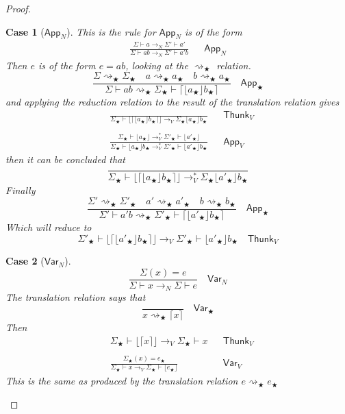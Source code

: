 \documentclass[float=false, crop=false]{standalone}
\newtheorem{case}{Case}
\numberwithin{subcase}{case}
\newcommand{\tlang}{\bigstar}
\newcommand{\thunk}[1]{\lceil #1 \rceil}
\newcommand{\unwrap}[1]{\lfloor #1 \rfloor}
\newcommand{\tcbn}{\rightarrow_N}
\newcommand{\tcbv}{\rightarrow_V}
\newcommand{\tccbv}{\rightarrow_V^*}
\newcommand{\tlthunk}{\rightsquigarrow_\tlang}
\begin{document}
\begin{proof}
  \begin{case}[$\mathsf{App}_N$]
    This is the rule for $\textsf{App}_N$ is of the form
    \begin{align*}
      \frac{\Sigma \vdash a \tcbn \Sigma' \vdash a'}
      {\Sigma \vdash ab \tcbn \Sigma' \vdash a' b} && \mathsf{App}_N
    \end{align*}
    Then $e$ is of the form $e = a b$, looking at the $\tlthunk$ relation.
    \[\frac{\Sigma \tlthunk \Sigma_\tlang \quad a 
        \tlthunk a_\tlang \quad b \tlthunk a_\tlang}
      { \Sigma \vdash a b\tlthunk \Sigma_\tlang \vdash 
        \thunk{\unwrap{a_\tlang }b_\tlang}} \quad \mathsf{App}_\tlang\]
    and applying the reduction relation to the result of the translation 
    relation gives
    \begin{align*}
      &\frac{}{\Sigma_\tlang \vdash \unwrap{\thunk{\unwrap{a_\tlang} b_\tlang} }  
        \tcbv \Sigma_\tlang  \unwrap{a_\tlang} b_\tlang} && \mathsf{Thunk}_V\\ \\
      &\frac{\Sigma_\tlang \vdash \unwrap{a_\tlang} \tccbv \Sigma'_\tlang \vdash \unwrap{a'_\tlang}}{
      \Sigma_\tlang \vdash \unwrap{a_\tlang} b_\tlang \tccbv \Sigma'_\tlang \vdash 
      \unwrap{a'_\tlang} b_\tlang } &&
      \mathsf{App}_V
    \end{align*}
    then it can be concluded that 
    \[ \frac{}{\Sigma_\tlang \vdash \unwrap{\thunk{\unwrap{a_\tlang} b_\tlang}}
        \tccbv \Sigma_\tlang \unwrap{a'_\tlang} b_\tlang  } \]
    Finally \[ \frac{\Sigma' \tlthunk \Sigma'_\tlang \quad a' \tlthunk a'_\tlang \quad b \tlthunk b_\tlang}
      {\Sigma' \vdash a' b \tlthunk \Sigma'_\tlang \vdash \thunk{\unwrap{a'_\tlang} b_\tlang} } \quad \mathsf{App}_\tlang \]
    Which will reduce to
    \[\Sigma'_\tlang \vdash \unwrap{\thunk{\unwrap{a'_\tlang}b_\tlang}} \tcbv \Sigma'_\tlang \vdash
    \unwrap {a'_\tlang} b_\tlang \quad \mathsf{Thunk}_V\]

  \end{case}

  \begin{case}[$\mathsf{Var}_N$]
    \[ \frac{\Sigma(x) = e}{\Sigma \vdash x \tcbn \Sigma \vdash e} \quad
      \mathsf{Var}_N \]
    The translation relation says that \[ \frac{}{x \tlthunk \thunk{x}} 
      \quad \mathsf{Var}_\tlang \]
    Then 
    \begin{align*}
    & \Sigma_\tlang \vdash \unwrap{\thunk{x}} \tcbv \Sigma_\tlang \vdash x  && \mathsf{Thunk}_V \\ \\
    & \frac{\Sigma_\tlang(x) = e_\tlang}
    {\Sigma_\tlang \vdash x  \tcbv \Sigma_\tlang \vdash \unwrap{e_\tlang}} && \mathsf{Var}_V 
  \end{align*}
    This is the same as produced by the translation relation 
    \mbox{$e \tlthunk e_\tlang$}
  \end{case}


\end{proof}
\end{document}
